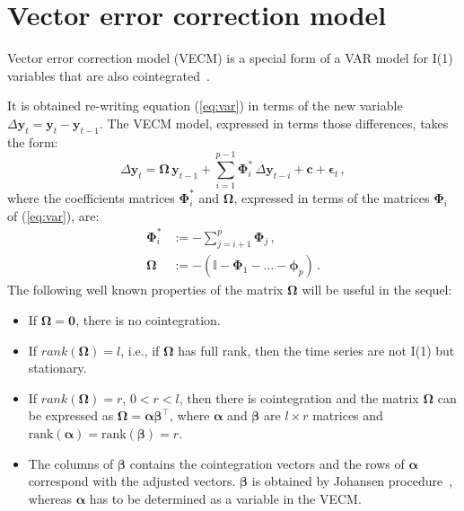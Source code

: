 \section{Vector error correction model}
Vector error correction model (VECM)  \cite{engle87} is a special form of a VAR model for I(1) variables that are also
cointegrated~\cite{banerjee1993}.

It is obtained re-writing equation (\ref{eq:var}) in terms of the new
variable $\Delta\mathbf{y}_t=\mathbf{y}_t-\mathbf{y}_{t-1}$.
The VECM model, expressed in terms those differences, takes the form:
\begin{equation}\label{eq:vec}
\Delta \mathbf{y}_t 
= \boldsymbol{\Omega}\,\mathbf{y}_{t-1}
  + \sum_{i=1}^{p-1} \boldsymbol{\Phi}_i^*\,\Delta\mathbf{y}_{t-i}
  + \mathbf{c} + \boldsymbol{\epsilon}_t\,,
\end{equation}
\noindent
where the coefficients matrices $\boldsymbol{\Phi}_i^*$ and 
$\boldsymbol{\Omega}$, expressed in terms of the matrices
$\boldsymbol{\Phi}_i$ of (\ref{eq:var}), are:
\begin{align*}
\boldsymbol{\Phi}_i^* 
&:= -\sum_{j=i+1}^{p}\boldsymbol{\Phi}_j\,, \\
\boldsymbol{\Omega}
&:= -\left( \mathbb{I} - \boldsymbol{\Phi}_1 - \dots 
    - \boldsymbol{\phi}_p \right)\,. 
\end{align*}
The following well known properties of the matrix $\boldsymbol{\Omega}$
\cite{johansen1995} will be useful in the sequel:
\begin{itemize}
\item
If $\boldsymbol{\Omega} = \mathbf{0}$, there is no cointegration.
\item 
If $rank(\boldsymbol{\Omega})=l$, i.e., if $\boldsymbol{\Omega}$ has
full rank, then the time series are not I(1) but stationary.
\item
If $rank(\boldsymbol{\Omega})=r$, $0<r<l$, then there is cointegration
and the matrix $\boldsymbol{\Omega}$ can be expressed as
$\boldsymbol{\Omega}=\boldsymbol{\alpha\beta}^\top$, where $\boldsymbol{\alpha}$
and $\boldsymbol{\beta}$ are
$l\times r$ matrices and
$\text{rank}(\boldsymbol{\alpha})=\text{rank}(\boldsymbol{\beta})=r$.
\item
The columns of $\boldsymbol{\beta}$ contains the cointegration vectors and the rows of
$\boldsymbol{\alpha}$ correspond with the adjusted vectors. 
$\boldsymbol{\beta}$ is obtained by Johansen procedure~\cite{johansen1988},
whereas $\boldsymbol{\alpha}$ has to be determined as a variable in the VECM.
\end{itemize}
